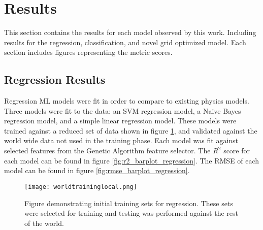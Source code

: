 \section{Results}
\setlength{\parindent}{10ex}

This section contains the results for each model observed by this work.
Including results for the regression, classification, and novel grid optimized model.
Each section includes figures representing the metric scores.

\subsection{Regression Results}
Regression \ac{ML} models were fit in order to compare to existing physics models.
Three models were fit to the data: 
an SVM regression model, a Naive Bayes regression model, and a simple linear regression model.
These models were trained against a reduced set of data shown in figure \ref{fig:trainset}, and validated against the world wide data not used in the training phase.
Each model was fit against selected features from the Genetic Algorithm feature selector.
The \(R^2\) score for each model can be found in figure \ref{fig:r2_barplot_regression}.
The RMSE of each model can be found in figure \ref{fig:rmse_barplot_regression}.



\begin{figure}[h]
    \centering
    \texttt{[image: worldtraininglocal.png]}
    \caption{Figure demonstrating initial training sets for regression. These sets were selected for training and testing was performed against the rest of the world.}
    \label{fig:trainset}
\end{figure}


